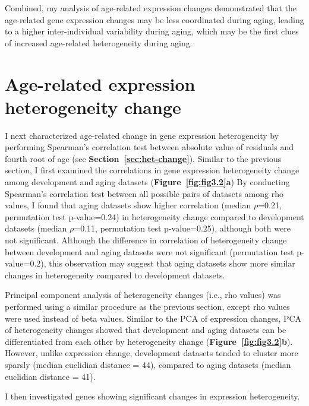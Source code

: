 Combined, my analysis of age-related expression changes demonstrated that the age-related gene expression changes may be less coordinated during aging,
leading to a higher inter-individual variability during aging, which may be the first clues of increased age-related heterogeneity during aging.

\section{Age-related expression heterogeneity change}
I next characterized age-related change in gene expression heterogeneity by performing Spearman's correlation test between absolute value of residuals and fourth root of age (see \textbf{Section~\ref{sec:het-change}}).
Similar to the previous section, I first examined the correlations in gene expression heterogeneity change among development and aging datasets (\textbf{Figure~\ref{fig:fig3.2}a})
By conducting  Spearman's correlation test between all possible pairs of datasets among rho values, 
I found that aging datasets show higher correlation (median $\rho$=0.21, permutation test p-value=0.24) in heterogeneity change
compared to development datasets (median $\rho$=0.11, permutation test p-value=0.25), although both were not significant.
Although the difference in correlation of heterogeneity change between development and aging datasets were not significant (permutation test p-value=0.2),
this observation may suggest that aging datasets show more similar changes in heterogeneity compared to development datasets.

Principal component analysis of heterogeneity changes (i.e., rho values) was performed using a similar procedure as the previous section, 
except rho values were used instead of beta values. 
Similar to the PCA of expression changes, PCA of heterogeneity changes showed that development and aging datasets can be differentiated from each other by heterogeneity change (\textbf{Figure~\ref{fig:fig3.2}b}).
However, unlike expression change, development datasets tended to cluster more sparsly (median euclidian distance = 44), compared to aging datasets (median euclidian distance = 41).

I then investigated genes showing significant changes in expression heterogeneity. 

